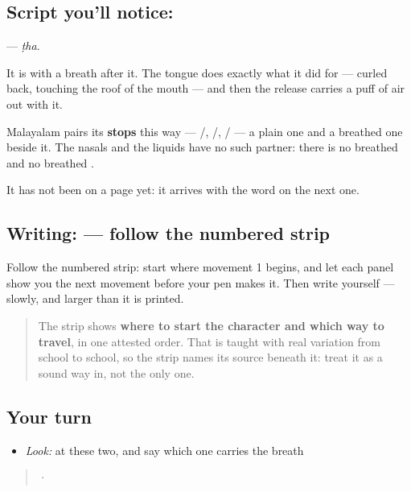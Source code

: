 \subsection*{Script you'll notice: }
\textbf{} — \emph{ṭha}.

It is \textbf{} with a breath after it. The tongue does exactly what it did for \textbf{} — curled back, touching the roof of the mouth — and then the release carries a puff of air out with it.

Malayalam pairs its \textbf{stops} this way — \textbf{}/\textbf{}, \textbf{}/\textbf{}, \textbf{}/\textbf{} — a plain one and a breathed one beside it. The nasals and the liquids have no such partner: there is no breathed \textbf{} and no breathed \textbf{}.

It has not been on a page yet: it arrives with the word on the next one.

\subsection*{Writing:  — follow the numbered strip}

Follow the numbered strip: start where movement 1 begins, and let each panel show you the next movement before your pen makes it. Then write  yourself — slowly, and larger than it is printed.

\begin{quote}
The strip shows \textbf{where to start the character and which way to travel}, in one attested order. That is taught with real variation from school to school, so the strip names its source beneath it: treat it as a sound way in, not the only one.
\end{quote}

\subsection*{Your turn}
\begin{itemize}
\raggedright
  \item \emph{Look:} at these two, and say which one carries the breath
\end{itemize}

\begin{quote}
  ·  
\end{quote}

